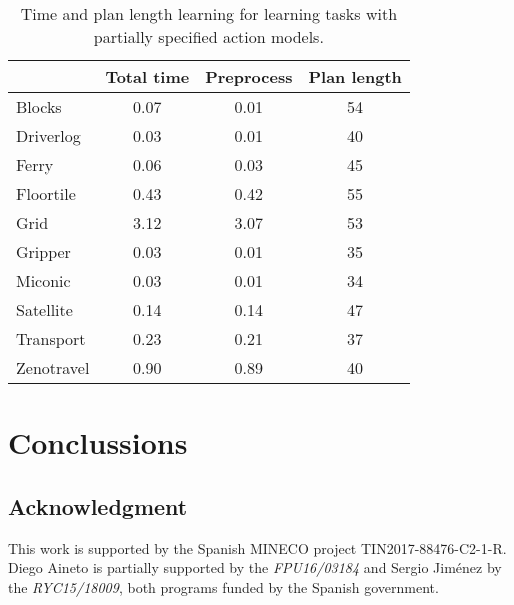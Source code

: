 \documentclass[3p,times]{elsarticle}
\begin{document}
\begin{table}
\begin{footnotesize}
	\begin{center}
		\begin{tabular}{l|c|c|c|}			
			 & Total time & Preprocess & Plan length  \\
                         \hline
			Blocks & 0.07 & 0.01 & 54  \\
			Driverlog & 0.03 & 0.01 & 40 \\
			Ferry & 0.06 & 0.03 & 45 \\
			Floortile & 0.43 & 0.42 & 55 \\
                        Grid & 3.12 & 3.07 & 53 \\
			Gripper & 0.03 & 0.01 & 35 \\
			Miconic & 0.03 & 0.01 & 34  \\
			Satellite & 0.14 & 0.14 & 47 \\
			Transport & 0.23 & 0.21 & 37 \\
			Zenotravel & 0.90 & 0.89 & 40 \\
		\end{tabular}
	\end{center}
        \end{footnotesize}
	\caption{\small Time and plan length learning for learning tasks with partially specified action models.}
	\label{tab:time_plans_partial}	
\end{table}



  
\section{Conclussions}
\label{sec:Section9}



\begin{small}
\subsection*{Acknowledgment}
This work is supported by the Spanish MINECO project TIN2017-88476-C2-1-R. Diego Aineto is partially supported by the {\it FPU16/03184} and Sergio Jim\'enez by the {\it RYC15/18009}, both programs funded by the Spanish government.
\end{small}


\end{document}

